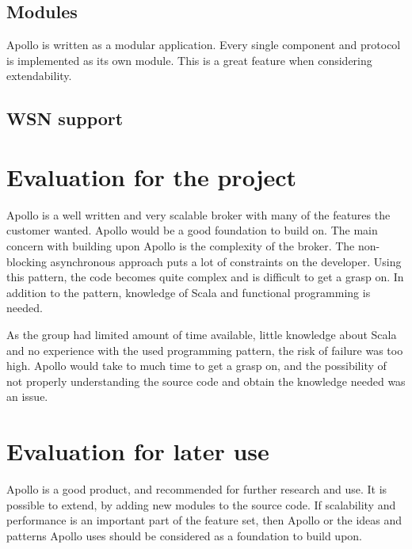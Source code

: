 \subsection{Modules}
Apollo is written as a modular application. Every single component and protocol is implemented as its own module. This is a great feature when considering extendability. 

\subsection{WSN support}

\section{Evaluation for the project}
Apollo is a well written and very scalable broker with many of the features the customer wanted. Apollo would be a good foundation to build on. The main concern with building upon Apollo is the complexity of the broker. The non-blocking asynchronous approach puts a lot of constraints on the developer. Using this pattern, the code becomes quite complex and is difficult to get a grasp on. In addition to the pattern, knowledge of Scala and functional programming is needed. 

As the group had limited amount of time available, little knowledge about Scala and no experience with the used programming pattern, the risk of failure was too high. Apollo would take to much time to get a grasp on, and the possibility of not properly understanding the source code and obtain the knowledge needed was an issue.

\section{Evaluation for later use}

Apollo is a good product, and recommended for further research and use. It is possible to extend, by adding new modules to the source code. If scalability and performance is an important part of the feature set, then Apollo or the ideas and patterns Apollo uses should be considered as a foundation to build upon.
